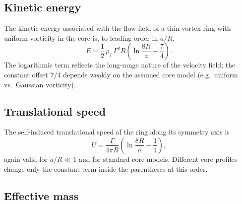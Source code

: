 \documentclass[11pt]{article}
\begin{document}
    \subsection{Kinetic energy}

        The kinetic energy associated with the flow field of a thin vortex ring with uniform
        vorticity in the core is, to leading order in $a/R$,\,%
        \begin{equation}
            E
            = \frac{1}{2}\,\rho_f\,\Gamma^2 R
            \left(
                \ln\frac{8R}{a} - \frac{7}{4}
            \right).
            \label{eq:ring-energy}
        \end{equation}
        The logarithmic term reflects the long-range nature of the velocity field; the constant
        offset $7/4$ depends weakly on the assumed core model (e.g.\ uniform vs.\ Gaussian
        vorticity).

    \subsection{Translational speed}

        The self-induced translational speed of the ring along its symmetry axis is
        \begin{equation}
            U
            = \frac{\Gamma}{4\pi R}
            \left(
                \ln\frac{8R}{a} - \frac{1}{4}
            \right),
            \label{eq:ring-speed}
        \end{equation}
        again valid for $a/R \ll 1$ and for standard core models. Different core profiles change
        only the constant term inside the parentheses at this order.

    \subsection{Effective mass}
\end{document}
